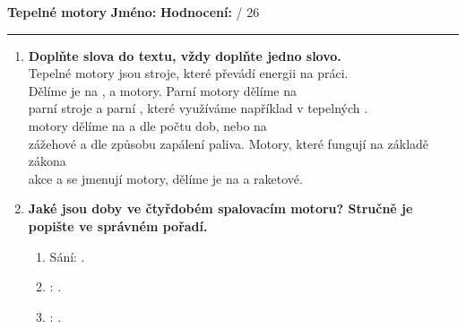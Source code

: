 \documentclass[../main.tex]{subfiles}
\begin{document}
\pagestyle{empty}

{\Large\textbf{Tepelné motory}}
\hfill
\textbf{Jméno:}
\tecky{5cm}
\hspace{0.25cm}
\textbf{Hodnocení:}
\tecky{0.5cm}
{/}
{26}
\vspace{0.25cm}
\hrule

\begin{enumerate}[label={\textbf{\arabic*.}}]
    \item \textbf{Doplňte slova do textu, vždy doplňte jedno slovo.}\vspace{0.25cm}\\ 
    {Tepelné motory jsou stroje, které převádí \cara{3cm} energii na \cara{4cm} práci. \\
    Dělíme je na \cara{3cm}, \cara{3cm} a \cara{3cm} motory. Parní motory dělíme na \\
    parní stroje a parní \cara{3cm}, které využíváme například v tepelných \cara{3cm}.\\
    \cara{3cm} motory dělíme na \cara{3cm} a \cara{3cm} dle počtu dob, nebo na \\
    zážehové a \cara{3cm} dle způsobu zapálení paliva. Motory, které fungují na základě zákona\\
    akce a \cara{3cm} se jmenují \cara{3cm} motory, dělíme je na \cara{3cm} a raketové.}
    \vspace{-0.5cm}
    \item \textbf{Jaké jsou doby ve čtyřdobém spalovacím motoru? Stručně je popište ve správném pořadí.}
    \begin{enumerate}[label={\arabic*.}]
        \item {Sání:}\hspace{1.75cm}\tecky{14cm} .
        \item {}\tecky{2cm}:\hspace{0.5cm}\tecky{14cm} .
        \item {}\tecky{2cm}:\hspace{0.5cm}\tecky{14cm} .

\end{enumerate}
\end{enumerate}
\end{document}
